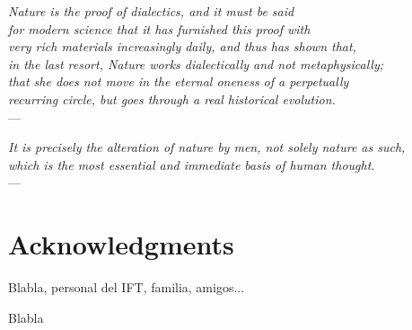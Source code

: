 
\begin{flushright}{\slshape
	Nature is the proof of dialectics, and it must be said \\
	for modern science that it has furnished this proof with \\
	very rich materials increasingly daily, and thus has shown that, \\
	in the last resort, Nature works dialectically and not metaphysically; \\
	that she does not move in the eternal oneness of a perpetually \\
	recurring circle, but goes through a real historical evolution.} \\ \medskip
    ---  
\end{flushright}

\begin{flushright}{\slshape
	It is precisely the alteration of nature by men, not solely nature as such, \\
	which is the most essential and immediate basis of human thought.} \\ \medskip
    ---  
\end{flushright}



\bigskip

\begingroup
\let\clearpage\relax
\let\cleardoublepage\relax
\let\cleardoublepage\relax
\chapter*{Acknowledgments}
Blabla, personal del IFT, familia, amigos...

\bigskip

\noindent Blabla


\endgroup
